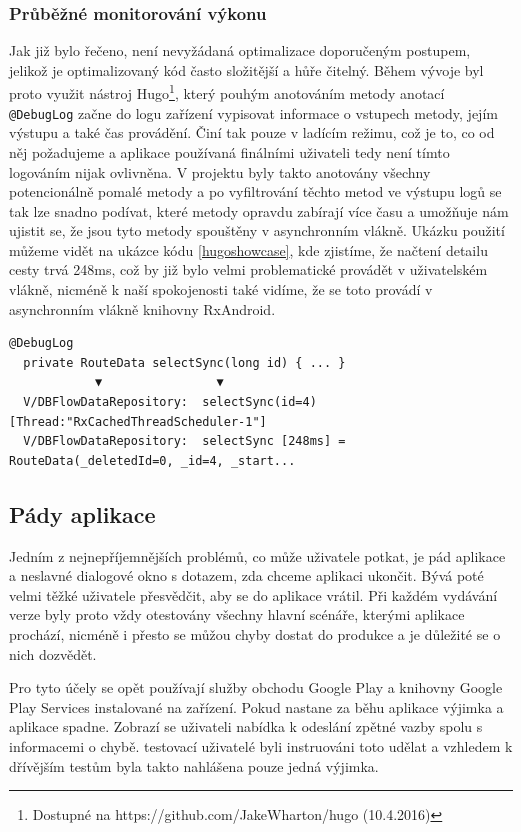 \documentclass[czech,master,public,dept460,male,java,cpdeclaration]{diploma}
\begin{document}
\subsubsection{Průběžné monitorování výkonu}
Jak již bylo řečeno, není nevyžádaná optimalizace doporučeným postupem, jelikož je optimalizovaný kód
často složitější a hůře čitelný. Během vývoje byl proto využit nástroj
Hugo\footnote{Dostupné na https://github.com/JakeWharton/hugo (10.4.2016)}, který pouhým
anotováním metody anotací \texttt{@DebugLog} začne do logu zařízení vypisovat informace o vstupech metody,
jejím výstupu a také čas provádění. Činí tak pouze v ladícím režimu, což je to, co od něj požadujeme
a aplikace používaná finálními uživateli tedy není tímto logováním nijak ovlivněna. V projektu byly
takto anotovány všechny potencionálně pomalé metody a po vyfiltrování těchto metod ve výstupu logů se
tak lze snadno podívat, které metody opravdu zabírají více času a umožňuje nám ujistit se, že jsou
tyto metody spouštěny v asynchronním vlákně. Ukázku použití můžeme vidět na ukázce kódu \ref{hugoshowcase},
kde zjistíme, že načtení detailu cesty trvá 248ms, což by již bylo velmi problematické provádět v uživatelském
vlákně, nicméně k naší spokojenosti také vidíme, že se toto provádí v asynchronním vlákně knihovny RxAndroid.

\begin{lstlisting}[label=hugoshowcase,caption=Využití nástroje Hugo pro výpisy informací o prováděných metodách]
  @DebugLog
  private RouteData selectSync(long id) { ... }
            ▼                ▼
  V/DBFlowDataRepository:  selectSync(id=4) [Thread:"RxCachedThreadScheduler-1"]
  V/DBFlowDataRepository:  selectSync [248ms] = RouteData(_deletedId=0, _id=4, _start...
\end{lstlisting}

\subsection{Pády aplikace}
Jedním z nejnepříjemnějších problémů, co může uživatele potkat, je pád aplikace a neslavné dialogové
okno s dotazem, zda chceme aplikaci ukončit. Bývá poté velmi těžké uživatele přesvědčit, aby se
do aplikace vrátil. Při každém vydávání verze byly proto vždy otestovány všechny hlavní scénáře,
kterými aplikace prochází, nicméně i přesto se můžou chyby dostat do produkce a je důležité se
 o nich dozvědět.

 Pro tyto účely se opět používají služby obchodu Google Play a knihovny Google Play Services instalované
 na zařízení. Pokud nastane za běhu aplikace výjimka a aplikace spadne. Zobrazí se uživateli nabídka
 k odeslání zpětné vazby spolu s informacemi o chybě. testovací uživatelé byli instruováni toto udělat
 a vzhledem k dřívějším testům byla takto nahlášena pouze jedná výjimka.
\end{document}

